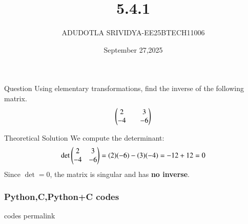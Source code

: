 \documentclass{beamer}
\title{5.4.1}
\date{September 27,2025}
\author{ADUDOTLA SRIVIDYA-EE25BTECH11006}
\begin{document}
\frame{\titlepage}

\begin{frame}{Question}
Using elementary transformations, find the inverse of the following matrix. 
\begin{align*}
    \begin{pmatrix}2&&3\\-4&&-6\end{pmatrix}
\end{align*}
\end{frame}

\begin{frame}{Theoretical Solution}
We compute the determinant:
\begin{align}
\det \begin{pmatrix}2 & 3 \\ -4 & -6\end{pmatrix} = (2)(-6) - (3)(-4) = -12 + 12 = 0
\end{align}
Since $\det=0$, the matrix is singular and has \textbf{no inverse}.
\end{frame}


\begin{frame}[fragile]
\frametitle{Python,C,Python+C codes}
codes permalink
\end{frame}
\end{document}
